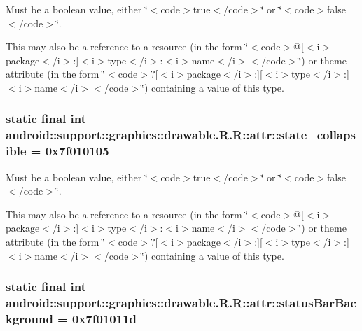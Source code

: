 Must be a boolean value, either \char`\"{}$<$code$>$true$<$/code$>$\char`\"{} or \char`\"{}$<$code$>$false$<$/code$>$\char`\"{}. 

This may also be a reference to a resource (in the form \char`\"{}$<$code$>$@\mbox{[}$<$i$>$package$<$/i$>$:\mbox{]}$<$i$>$type$<$/i$>$:$<$i$>$name$<$/i$>$$<$/code$>$\char`\"{}) or theme attribute (in the form \char`\"{}$<$code$>$?\mbox{[}$<$i$>$package$<$/i$>$:\mbox{]}\mbox{[}$<$i$>$type$<$/i$>$:\mbox{]}$<$i$>$name$<$/i$>$$<$/code$>$\char`\"{}) containing a value of this type. \hypertarget{classandroid_1_1support_1_1graphics_1_1drawable_1_1_r_1_1attr_425b4bb5508ac2c33f42507c0d5274df}{
\subsubsection[{state\_\-collapsible}]{\setlength{\rightskip}{0pt plus 5cm}static final int android::support::graphics::drawable.R.R::attr::state\_\-collapsible = 0x7f010105}}
\label{classandroid_1_1support_1_1graphics_1_1drawable_1_1_r_1_1attr_425b4bb5508ac2c33f42507c0d5274df}


Must be a boolean value, either \char`\"{}$<$code$>$true$<$/code$>$\char`\"{} or \char`\"{}$<$code$>$false$<$/code$>$\char`\"{}. 

This may also be a reference to a resource (in the form \char`\"{}$<$code$>$@\mbox{[}$<$i$>$package$<$/i$>$:\mbox{]}$<$i$>$type$<$/i$>$:$<$i$>$name$<$/i$>$$<$/code$>$\char`\"{}) or theme attribute (in the form \char`\"{}$<$code$>$?\mbox{[}$<$i$>$package$<$/i$>$:\mbox{]}\mbox{[}$<$i$>$type$<$/i$>$:\mbox{]}$<$i$>$name$<$/i$>$$<$/code$>$\char`\"{}) containing a value of this type. \hypertarget{classandroid_1_1support_1_1graphics_1_1drawable_1_1_r_1_1attr_eb9910c58b70f91901fff26bbc37b2e3}{
\subsubsection[{statusBarBackground}]{\setlength{\rightskip}{0pt plus 5cm}static final int android::support::graphics::drawable.R.R::attr::statusBarBackground = 0x7f01011d}}
\label{classandroid_1_1support_1_1graphics_1_1drawable_1_1_r_1_1attr_eb9910c58b70f91901fff26bbc37b2e3}


